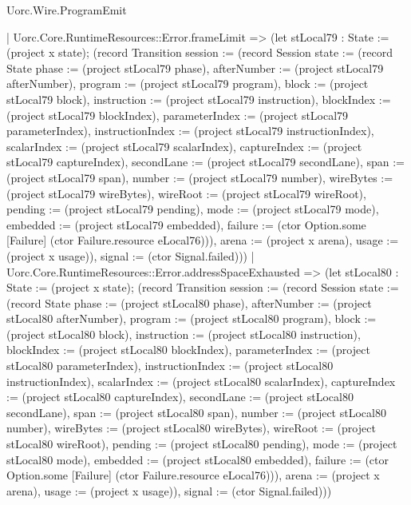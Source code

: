 \begin{lexlean}{Uorc.Wire.ProgramEmit}
\begin{semanticmodule}
{      | Uorc.Core.RuntimeResources::Error.frameLimit => (let stLocal79 : State := (project x state); (record Transition {session := (record Session {state := (record State {phase := (project stLocal79 phase), afterNumber := (project stLocal79 afterNumber), program := (project stLocal79 program), block := (project stLocal79 block), instruction := (project stLocal79 instruction), blockIndex := (project stLocal79 blockIndex), parameterIndex := (project stLocal79 parameterIndex), instructionIndex := (project stLocal79 instructionIndex), scalarIndex := (project stLocal79 scalarIndex), captureIndex := (project stLocal79 captureIndex), secondLane := (project stLocal79 secondLane), span := (project stLocal79 span), number := (project stLocal79 number), wireBytes := (project stLocal79 wireBytes), wireRoot := (project stLocal79 wireRoot), pending := (project stLocal79 pending), mode := (project stLocal79 mode), embedded := (project stLocal79 embedded), failure := (ctor Option.some [Failure] (ctor Failure.resource eLocal76))}), arena := (project x arena), usage := (project x usage)}), signal := (ctor Signal.failed)}))
      | Uorc.Core.RuntimeResources::Error.addressSpaceExhausted => (let stLocal80 : State := (project x state); (record Transition {session := (record Session {state := (record State {phase := (project stLocal80 phase), afterNumber := (project stLocal80 afterNumber), program := (project stLocal80 program), block := (project stLocal80 block), instruction := (project stLocal80 instruction), blockIndex := (project stLocal80 blockIndex), parameterIndex := (project stLocal80 parameterIndex), instructionIndex := (project stLocal80 instructionIndex), scalarIndex := (project stLocal80 scalarIndex), captureIndex := (project stLocal80 captureIndex), secondLane := (project stLocal80 secondLane), span := (project stLocal80 span), number := (project stLocal80 number), wireBytes := (project stLocal80 wireBytes), wireRoot := (project stLocal80 wireRoot), pending := (project stLocal80 pending), mode := (project stLocal80 mode), embedded := (project stLocal80 embedded), failure := (ctor Option.some [Failure] (ctor Failure.resource eLocal76))}), arena := (project x arena), usage := (project x usage)}), signal := (ctor Signal.failed)}))
}
\end{semanticmodule}
\end{lexlean}
